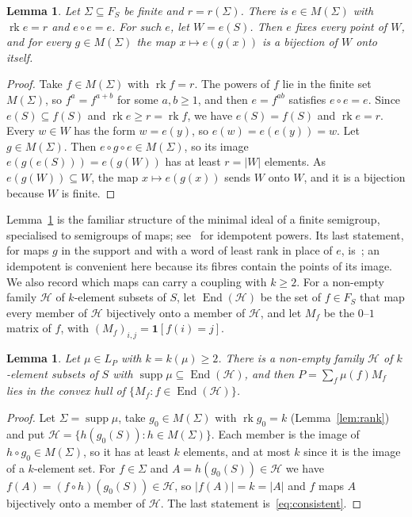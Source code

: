 \documentclass[11pt]{amsart}
\newtheorem{lemma}[theorem]{Lemma}
\theoremstyle{remark}
\newcommand{\rk}{\operatorname{rk}}
\begin{document}
\begin{lemma}\label{lem:idempotent}
Let $\Sigma\subseteq F_S$ be finite and $r=r(\Sigma)$. There is $e\in M(\Sigma)$ with $\rk e=r$ and $e\circ e=e$. For such
$e$, let $W=e(S)$. Then $e$ fixes every point of $W$, and for every $g\in M(\Sigma)$ the map $x\mapsto e(g(x))$ is a
bijection of $W$ onto itself.
\end{lemma}

\begin{proof}
Take $f\in M(\Sigma)$ with $\rk f=r$. The powers of $f$ lie in the finite set $M(\Sigma)$, so $f^a=f^{a+b}$ for some
$a,b\ge1$, and then $e=f^{ab}$ satisfies $e\circ e=e$. Since $e(S)\subseteq f(S)$ and $\rk e\ge r=\rk f$, we have
$e(S)=f(S)$ and $\rk e=r$. Every $w\in W$ has the form $w=e(y)$, so $e(w)=e(e(y))=w$. Let $g\in M(\Sigma)$. Then
$e\circ g\circ e\in M(\Sigma)$, so its image $e(g(e(S)))=e(g(W))$ has at least $r=|W|$ elements. As $e(g(W))\subseteq W$,
the map $x\mapsto e(g(x))$ sends $W$ onto $W$, and it is a bijection because $W$ is finite.
\end{proof}

Lemma~\ref{lem:idempotent} is the familiar structure of the minimal ideal of a finite semigroup, specialised to
semigroups of maps; see~\cite[Chapter~1]{How95} for idempotent powers. Its last statement, for maps $g$ in the support
and with a word of least rank in place of $e$, is~\cite[(4.7)--(4.9)]{Yan13}; an idempotent is convenient here because
its fibres contain the points of its image. We also record which maps can carry a
coupling with $k\ge2$. For a non-empty family $\mathcal H$ of $k$-element subsets of $S$, let $\operatorname{End}(\mathcal H)$
be the set of $f\in F_S$ that map every member of $\mathcal H$ bijectively onto a member of $\mathcal H$, and let $M_f$
be the $0$--$1$ matrix of $f$, with $(M_f)_{i,j}=\mathbf 1[f(i)=j]$.

\begin{lemma}\label{lem:support}
Let $\mu\in L_P$ with $k=k(\mu)\ge2$. There is a non-empty family $\mathcal H$ of $k$-element subsets of $S$ with
$\operatorname{supp}\mu\subseteq\operatorname{End}(\mathcal H)$, and then $P=\sum_f\mu(f)M_f$ lies in the convex hull of
$\{M_f:f\in\operatorname{End}(\mathcal H)\}$.
\end{lemma}

\begin{proof}
Let $\Sigma=\operatorname{supp}\mu$, take $g_0\in M(\Sigma)$ with $\rk g_0=k$ (Lemma~\ref{lem:rank}) and put
$\mathcal H=\{h(g_0(S)):h\in M(\Sigma)\}$. Each member is the image of $h\circ g_0\in M(\Sigma)$, so it has at least $k$
elements, and at most $k$ since it is the image of a $k$-element set. For $f\in\Sigma$ and $A=h(g_0(S))\in\mathcal H$
we have $f(A)=(f\circ h)(g_0(S))\in\mathcal H$, so $|f(A)|=k=|A|$ and $f$ maps $A$ bijectively onto a member of
$\mathcal H$. The last statement is~\eqref{eq:consistent}.
\end{proof}
\end{document}
